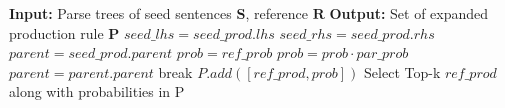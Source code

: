 \begin{algorithm}
  \caption{\ProdDiffAlgCaption}
  \begin{algorithmic}[1]
    \State \textbf{Input:} Parse trees of seed sentences $\textbf{S}$,
    reference \pcfg$\textbf{R}$
    \State \textbf{Output:} Set of expanded production rule $\textbf{P}$
        \State $seed\_lhs = seed\_prod.lhs$
        \State $seed\_rhs = seed\_prod.rhs$
            \State $parent = seed\_prod.parent$
            \State $prob = ref\_prob$
                  \State $prob = prob \cdot par\_prob$
                  \State $parent = parent.parent$
                  \State break
                \EndIf
              \EndFor  
            \EndWhile
            \State $P.add([ref\_prod, prob])$
          \EndIf
        \EndFor
      \EndFor
      \State Select Top-k $ref\_prod$ along with probabilities in P
    \EndFor
  \end{algorithmic}
\end{algorithm}
